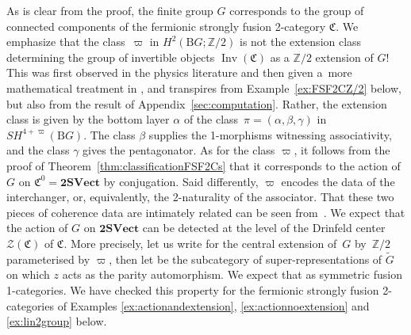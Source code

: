 \documentclass[10pt,a4paper]{amsart}
\numberwithin{equation}{section}
\begin{document}
\begin{Remark}\label{rem:varpialphaunfolding}
As is clear from the proof, the finite group $G$ corresponds to the group of connected components of the fermionic strongly fusion 2-category $\mathfrak{C}$. We emphasize that the class~$\varpi$ in $H^2(\mathrm{B}G;\mathbb{Z}/2)$ is not the extension class determining the group of invertible objects $\operatorname{Inv}(\mathfrak{C})$ as a $\mathbb{Z}/2$ extension of $G$! This was first observed in the physics literature \cite{LW} and then given a~more mathematical treatment in \cite{JF2}, and transpires from Example~\ref{ex:FSF2CZ/2} below, but also from the result of Appendix~\ref{sec:computation}. Rather, the extension class is given by the bottom layer $\alpha$ of the class~${\pi=(\alpha,\beta,\gamma)}$ in $SH^{4+\varpi}(\mathrm{B}G)$. The class $\beta$ supplies the 1-morphisms witnessing associativity, and the class $\gamma$ gives the pentagonator. As for the class $\varpi$, it follows from the proof of Theorem~\ref{thm:classificationFSF2Cs} that it corresponds to the action of $G$ on $\mathfrak{C}^0=\mathbf{2SVect}$ by conjugation. Said differently, $\varpi$ encodes the data of the interchanger, or, equivalently, the 2-naturality of the associator. That these two pieces of coherence data are intimately related can be seen from~\cite[Proposition~4.2, equation~(A$\hat{a}$2)]{El1}. We expect that the action of $G$ on $\mathbf{2SVect}$ can be detected at the level of the Drinfeld center $\mathscr{Z}(\mathfrak{C})$ of $\mathfrak{C}$. More precisely, let us write  for the central extension of~$G$ by~$\mathbb{Z}/2$ parameterised by $\varpi$, then let  be the subcategory of super-representations of $\widetilde{G}$ on which $z$ acts as the parity automorphism. We expect that  as symmetric fusion 1-categories. We have checked this property for the fermionic strongly fusion 2-categories of Examples \ref{ex:actionandextension}, \ref{ex:actionnoextension} and \ref{ex:lin2group} below.
\end{Remark}
\end{document}
